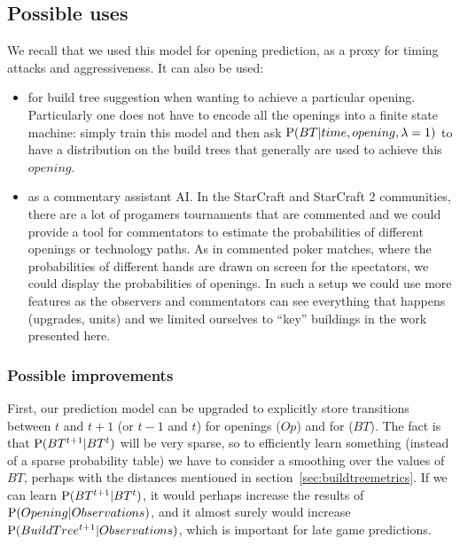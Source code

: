 \subsection{Possible uses}
We recall that we used this model for opening prediction, as a proxy for timing attacks and aggressiveness. It can also be used:
\begin{itemize}
    \item for build tree suggestion when wanting to achieve a particular opening. Particularly one does not have to encode all the openings into a finite state machine: simply train this model and then ask $\mathrm{P}(BT|time,opening,\lambda=1)$ to have a distribution on the build trees that generally are used to achieve this $opening$.
    \item as a commentary assistant AI. In the StarCraft and StarCraft 2 communities, there are a lot of progamers tournaments that are commented and we could provide a tool for commentators to estimate the probabilities of different openings or technology paths. As in commented poker matches, where the probabilities of different hands are drawn on screen for the spectators, we could display the probabilities of openings. In such a setup we could use more features as the observers and commentators can see everything that happens (upgrades, units) and we limited ourselves to ``key'' buildings in the work presented here.
\end{itemize}

\subsubsection{Possible improvements}
\label{sec:openingspossibleimprovements}

First, our prediction model can be upgraded to explicitly store transitions between $t$ and $t+1$ (or $t-1$ and $t$) for openings ($Op$) and for  ($BT$). The fact is that $\mathrm{P}(BT^{t+1}|BT^t)$ will be very sparse, so to efficiently learn something (instead of a sparse probability table) we have to consider a smoothing over the values of $BT$, perhaps with the distances mentioned in section~\ref{sec:buildtreemetrics}. If we can learn $\mathrm{P}(BT^{t+1}|BT^t)$, it would perhaps increase the results of $\mathrm{P}(Opening|Observations)$, and it almost surely would increase $\mathrm{P}(BuildTree^{t+1}|Observations)$, which is important for late game predictions. 

